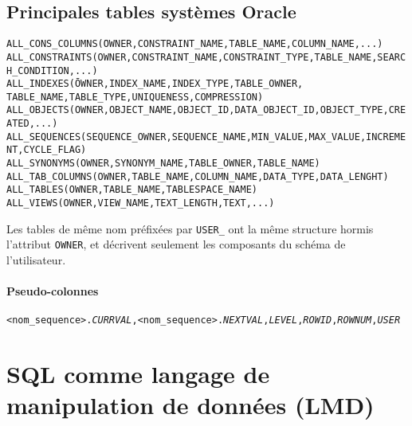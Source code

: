 \documentclass[10pt]{article}
\begin{document}
		\subsection{Principales tables systèmes Oracle}
			\begin{alltt}
				\begin{tabbing}
					ALL_CONS_COLUMNS \= (OWNER, CONSTRAINT_NAME, TABLE_NAME, COLUMN_NAME,...)\\
					ALL_CONSTRAINTS \> (OWNER, CONSTRAINT_NAME, CONSTRAINT_TYPE, TABLE_NAME, SEARCH_CONDITION,...)\\
					ALL_INDEXES \> (\=OWNER, INDEX_NAME, INDEX_TYPE, TABLE_OWNER, \\
								\>\>TABLE_NAME, TABLE_TYPE, UNIQUENESS, COMPRESSION)\\
					ALL_OBJECTS \> (OWNER, OBJECT_NAME, OBJECT_ID, DATA_OBJECT_ID, OBJECT_TYPE, CREATED, ...)\\
					ALL_SEQUENCES \> (SEQUENCE_OWNER, SEQUENCE_NAME, MIN_VALUE, MAX_VALUE, INCREMENT, CYCLE_FLAG)\\
					ALL_SYNONYMS \> (OWNER, SYNONYM_NAME, TABLE_OWNER, TABLE_NAME)\\
					ALL_TAB_COLUMNS \> (OWNER, TABLE_NAME, COLUMN_NAME, DATA_TYPE, DATA_LENGHT)\\
					ALL_TABLES \> (OWNER, TABLE_NAME, TABLESPACE_NAME)\\
					ALL_VIEWS \> (OWNER, VIEW_NAME, TEXT_LENGTH, TEXT,...)
				\end{tabbing}
			\end{alltt}
			
			Les tables de même nom préfixées par \texttt{USER\_} ont la même structure hormis l'attribut \texttt{OWNER}, et décrivent seulement les composants du schéma de l'utilisateur.
			
			\paragraph{Pseudo-colonnes}
				\begin{alltt}
					<nom_sequence>.\emph{CURRVAL}, <nom_sequence>.\emph{NEXTVAL}, \emph{LEVEL}, \emph{ROWID}, \emph{ROWNUM}, \emph{USER}
				\end{alltt}
				
	\section{SQL comme langage de manipulation de données (LMD)}
\end{document}
